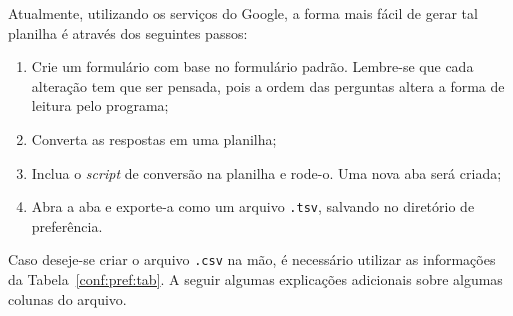 \documentclass[a4paper, 12pt]{report}
\begin{document}
Atualmente, utilizando os serviços do Google, a forma mais fácil de
gerar tal planilha é através dos seguintes passos:

\begin{enumerate}
\item Crie um formulário com base no formulário padrão. Lembre-se que
  cada alteração tem que ser pensada, pois a ordem das perguntas
  altera a forma de leitura pelo programa;

\item Converta as respostas em uma planilha;

\item Inclua o \textit{script} de conversão na planilha e rode-o. Uma
  nova aba será criada;

\item Abra a aba e exporte-a como um arquivo \verb+.tsv+, salvando no
  diretório de preferência.
\end{enumerate}

Caso deseje-se criar o arquivo \texttt{.csv} na mão, é necessário
utilizar as informações da Tabela~\ref{conf:pref:tab}. A seguir
algumas explicações adicionais sobre algumas colunas do arquivo.
\end{document}

